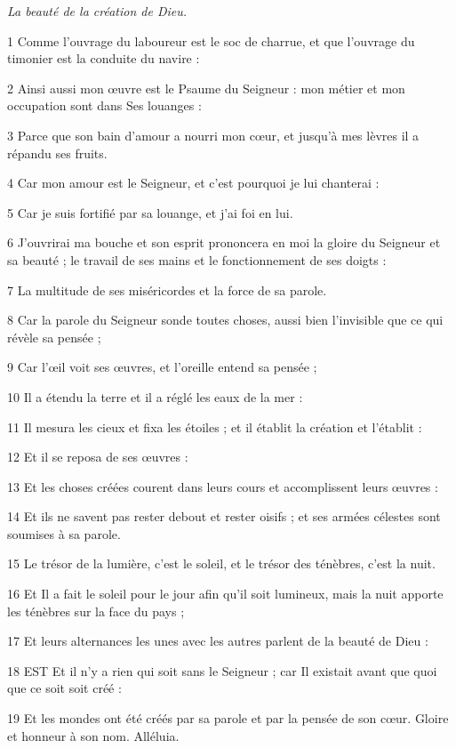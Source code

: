 
\par \textit{La beauté de la création de Dieu.}

\par 1 Comme l'ouvrage du laboureur est le soc de charrue, et que l'ouvrage du timonier est la conduite du navire :
\par 2 Ainsi aussi mon œuvre est le Psaume du Seigneur : mon métier et mon occupation sont dans Ses louanges :
\par 3 Parce que son bain d'amour a nourri mon cœur, et jusqu'à mes lèvres il a répandu ses fruits.
\par 4 Car mon amour est le Seigneur, et c'est pourquoi je lui chanterai :
\par 5 Car je suis fortifié par sa louange, et j'ai foi en lui.
\par 6 J'ouvrirai ma bouche et son esprit prononcera en moi la gloire du Seigneur et sa beauté ; le travail de ses mains et le fonctionnement de ses doigts :
\par 7 La multitude de ses miséricordes et la force de sa parole.
\par 8 Car la parole du Seigneur sonde toutes choses, aussi bien l'invisible que ce qui révèle sa pensée ;
\par 9 Car l'œil voit ses œuvres, et l'oreille entend sa pensée ;
\par 10 Il a étendu la terre et il a réglé les eaux de la mer :
\par 11 Il mesura les cieux et fixa les étoiles ; et il établit la création et l'établit :
\par 12 Et il se reposa de ses œuvres :
\par 13 Et les choses créées courent dans leurs cours et accomplissent leurs œuvres :
\par 14 Et ils ne savent pas rester debout et rester oisifs ; et ses armées célestes sont soumises à sa parole.
\par 15 Le trésor de la lumière, c'est le soleil, et le trésor des ténèbres, c'est la nuit.
\par 16 Et Il a fait le soleil pour le jour afin qu'il soit lumineux, mais la nuit apporte les ténèbres sur la face du pays ;
\par 17 Et leurs alternances les unes avec les autres parlent de la beauté de Dieu :
\par 18 EST Et il n'y a rien qui soit sans le Seigneur ; car Il existait avant que quoi que ce soit soit créé :
\par 19 Et les mondes ont été créés par sa parole et par la pensée de son cœur. Gloire et honneur à son nom. Alléluia.

